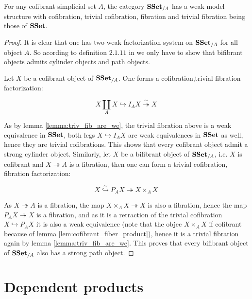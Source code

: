 \documentclass[reqno,10pt,a4paper,oneside,draft]{amsart}
\begin{document}

\begin{corollary}
For any cofibrant simplicial set $A$, the category $\mathbf{SSet}_{/A}$ has a weak model structure with cofibration, trivial cofibration, fibration and trivial fibration being those of $\mathbf{SSet}$.
\end{corollary}

\begin{proof}

It is clear that one has two weak factorization system on $\mathbf{SSet}_{/A}$ for all object $A$. So acording to definition $2.1.11$ in \cite{henry2018wms} we only have to show that bifibrant objects admits cylinder objects and path objects.

Let $X$ be a cofibrant object of $\mathbf{SSet}_{/A}$. One forms a cofibration,trivial fibration factorization:

\[ X \coprod_A X \hookrightarrow I_A X \overset{\sim}{\twoheadrightarrow} X \]

As by lemma \ref{lemma:triv_fib_are_we}, the trivial fibration above is a weak equivalence in $\mathbf{SSet}$, both legs $X \hookrightarrow I_A X$ are weak equivalences in $\mathbf{SSet}$ as well, hence they are trivial cofibrations. This shows that every cofibrant object admit a strong cylinder object. Similarly, let $X$ be a bifibrant object of $\mathbf{SSet}_{/A}$, i.e. $X$ is cofibrant and $X \twoheadrightarrow A$ is a fibration, then one can form a trivial cofibration, fibration factorization:

\[ X \overset{\sim}{\hookrightarrow} P_A X {\twoheadrightarrow} X \times_{A} X \]

As $X \twoheadrightarrow A$ is a fibration, the map $X \times_A X \twoheadrightarrow X$ is also a fibration, hence the map $P_A X \twoheadrightarrow X$ is a fibration, and as it is a retraction of the trivial cofibration $X \hookrightarrow P_A X$ it is also a weak equivalence (note that the objec $X \times_A X$ if cofibrant because of lemma \ref{lem:cofibrant_fiber_product}), hence it is a trivial fibration again by lemma \ref{lemma:triv_fib_are_we}. This proves that every bifibrant object of $\mathbf{SSet}_{/A}$ also has a strong path object.

\end{proof}

\newpage

\section{Dependent products}
\end{document}

